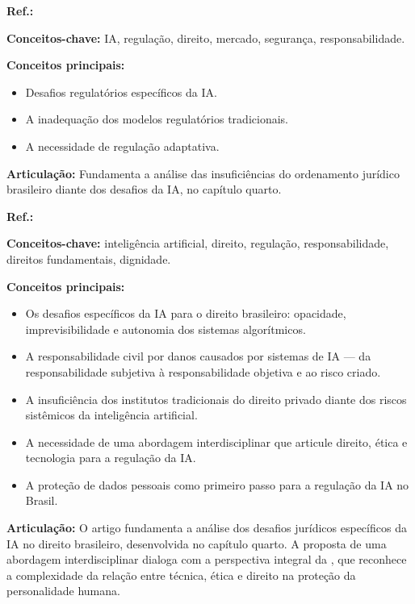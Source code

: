 \begin{fichamento}
    \textbf{Ref.:} \cite{Calo2017AIL}
    
    \textbf{Conceitos-chave:} IA, regulação, direito, mercado, segurança, responsabilidade.
    
    \textbf{Conceitos principais:}
    \begin{itemize}
        \item Desafios regulatórios específicos da IA.
        \item A inadequação dos modelos regulatórios tradicionais.
        \item A necessidade de regulação adaptativa.
    \end{itemize}
    
    \textbf{Articulação:} Fundamenta a análise das insuficiências do ordenamento jurídico brasileiro diante dos desafios da IA, no capítulo quarto.
\end{fichamento}

\begin{fichamento}
    \textbf{Ref.:} \cite{Mulholland2021IA}
    
    \textbf{Conceitos-chave:} inteligência artificial, direito, regulação, responsabilidade, direitos fundamentais, dignidade.
    
    \textbf{Conceitos principais:}
    \begin{itemize}
        \item Os desafios específicos da IA para o direito brasileiro: opacidade, imprevisibilidade e autonomia dos sistemas algorítmicos.
        \item A responsabilidade civil por danos causados por sistemas de IA — da responsabilidade subjetiva à responsabilidade objetiva e ao risco criado.
        \item A insuficiência dos institutos tradicionais do direito privado diante dos riscos sistêmicos da inteligência artificial.
        \item A necessidade de uma abordagem interdisciplinar que articule direito, ética e tecnologia para a regulação da IA.
        \item A proteção de dados pessoais como primeiro passo para a regulação da IA no Brasil.
    \end{itemize}
    
    \textbf{Articulação:} O artigo fundamenta a análise dos desafios jurídicos específicos da IA no direito brasileiro, desenvolvida no capítulo quarto. A proposta de uma abordagem interdisciplinar dialoga com a perspectiva integral da \MH{}, que reconhece a complexidade da relação entre técnica, ética e direito na proteção da personalidade humana.
\end{fichamento}

